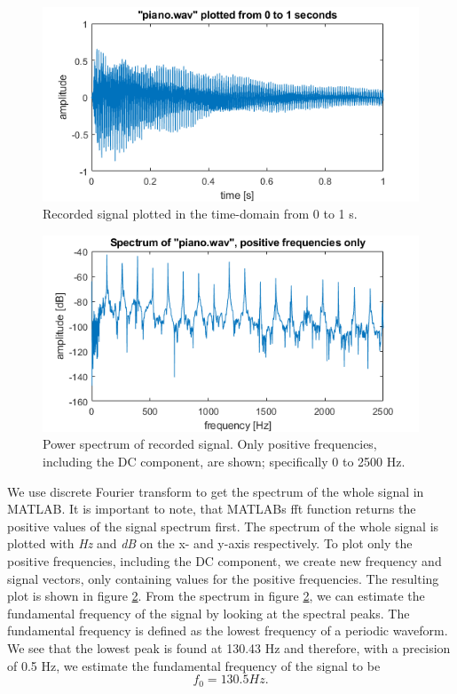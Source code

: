\documentclass[journal]{IEEEtran}
\begin{document}
\begin{figure} [h]
    \centering
    \includegraphics[width=\linewidth]{assignment_01/plots/time_plot.png}
    \caption{Recorded signal plotted in the time-domain from 0 to 1 s.}
    \label{fig:time}
\end{figure}
\begin{figure} [h]
    \centering
    \includegraphics[width=\linewidth]{assignment_01/plots/freq_plot.png}
    \caption{Power spectrum of recorded signal. Only positive frequencies, including the DC component, are shown; specifically 0 to 2500 Hz.}
    \label{fig:freq}
\end{figure}

We use discrete Fourier transform to get the spectrum of the whole signal in MATLAB. It is important to note, that MATLABs fft function returns the positive values of the signal spectrum first. The spectrum of the whole signal is plotted with \textit{Hz} and \textit{dB} on the x- and y-axis respectively. %
To plot only the positive frequencies, including the DC component, we create new frequency and signal vectors, only containing values for the positive frequencies. The resulting plot is shown in figure \ref{fig:freq}.
\newline
From the spectrum in figure \ref{fig:freq}, we can estimate the fundamental frequency of the signal by looking at the spectral peaks. The fundamental frequency is defined as the lowest frequency of a periodic waveform. %
We see that the lowest peak is found at 130.43 Hz and therefore, with a precision of 0.5 Hz, we estimate the fundamental frequency of the signal to be
\begin{equation}
    f_0 = 130.5 Hz.
\end{equation}
\end{document}
